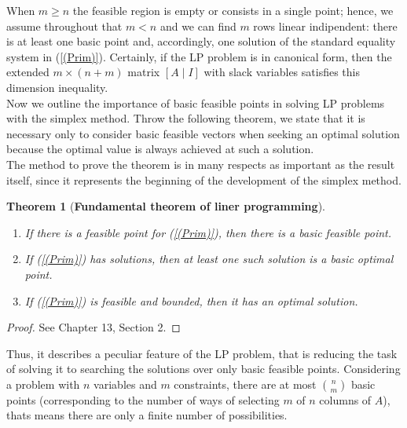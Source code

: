 \documentclass[a4paper,10 pt,titlepage,twoside]{book}
\theoremstyle{plain}
\newtheorem{thm}{Theorem}[chapter]
\theoremstyle{definition}
\theoremstyle{remark}
\begin{document}
When $m \geq n$ the feasible region is empty or consists in a single point; hence, we assume throughout that $m < n$ and we can find $m$ rows linear indipendent: there is at least one basic point and, accordingly, one solution of the standard equality system in (\ref{(Prim)}). Certainly, if the LP problem is in canonical form, then the extended $m \times (n+m)$ matrix $[A\;|\;I]$ with slack variables satisfies this dimension inequality. \\
Now we outline the importance of basic feasible points in solving LP problems with the simplex method.
Throw the following theorem, we state that it is necessary only to consider basic feasible
vectors when seeking an optimal solution because the optimal
value is always achieved at such a solution.\\ The method to prove the theorem is in many respects as important as the result itself, since it represents the beginning of the development of the simplex
method.
\begin{thm}[\textbf{Fundamental theorem of liner programming}]\label{Fund}
\begin{enumerate}
	\
\item If there is a feasible point for (\ref{(Prim)}), then there is a basic feasible point.
\item If (\ref{(Prim)}) has solutions, then at least one such solution is a basic optimal point.
\item If (\ref{(Prim)}) is feasible and bounded, then it has an optimal solution.
\end{enumerate}
\end{thm}
\begin{proof}
	See \cite{W} Chapter 13, Section 2.
\end{proof}
Thus, it describes a peculiar feature of the LP problem, that is reducing the task of solving it to searching the solutions over only basic feasible points. Considering a problem with $n$ variables and $m$ constraints, there are at most ${n}\choose{m}$ basic points (corresponding to the number of ways of selecting $m$ of $n$ columns of $A$), thats means there are only a finite number of possibilities.\\[0.5cm] 
\end{document}
